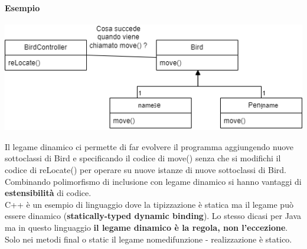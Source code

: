 \documentclass{article}
\begin{document}
	\paragraph*{Esempio}
	\begin{center}
		\includegraphics[scale=0.5]{assets/binding_dinamico_poli_inclusione.png}
	\end{center}
	Il legame dinamico ci permette di far evolvere il programma aggiungendo nuove sottoclassi di Bird e specificando il codice di move() senza che si modifichi il codice di reLocate() per operare su nuove istanze di nuove sottoclassi di Bird.
	\vspace{\baselineskip} \\
	Combinando polimorfismo di inclusione con legame dinamico si hanno vantaggi di \textbf{estensibilità} di codice.
	\vspace{\baselineskip} \\
	C++ è un esempio di linguaggio dove la tipizzazione è statica ma il legame può essere dinamico (\textbf{statically-typed dynamic binding}). Lo stesso dicasi per Java ma in questo linguaggio \textbf{il legame dinamico è la regola, non l'eccezione}. Solo nei metodi final o static il legame nomedifunzione - realizzazione è statico.
\end{document}
